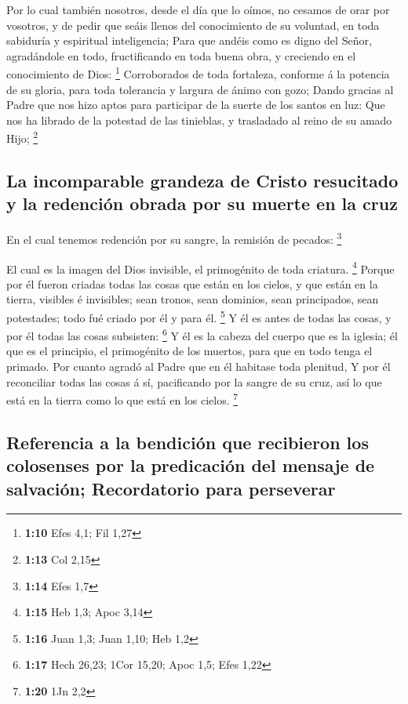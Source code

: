  Por lo cual también nosotros, desde el día que lo oímos, no
cesamos de orar por vosotros, y de pedir que seáis llenos del
conocimiento de su voluntad, en toda sabiduría y espiritual
inteligencia;  Para que andéis como es digno del Señor,
agradándole en todo, fructificando en toda buena obra, y creciendo en el
conocimiento de Dios: \footnote{\textbf{1:10} Efes 4,1; Fil 1,27}
 Corroborados de toda fortaleza, conforme á la potencia de
su gloria, para toda tolerancia y largura de ánimo con gozo;
 Dando gracias al Padre que nos hizo aptos para participar
de la suerte de los santos en luz:  Que nos ha librado de
la potestad de las tinieblas, y trasladado al reino de su amado Hijo;
\footnote{\textbf{1:13} Col 2,15}

\hypertarget{la-incomparable-grandeza-de-cristo-resucitado-y-la-redenciuxf3n-obrada-por-su-muerte-en-la-cruz}{%
\subsection{La incomparable grandeza de Cristo resucitado y la redención
obrada por su muerte en la
cruz}\label{la-incomparable-grandeza-de-cristo-resucitado-y-la-redenciuxf3n-obrada-por-su-muerte-en-la-cruz}}

 En el cual tenemos redención por su sangre, la remisión de
pecados: \footnote{\textbf{1:14} Efes 1,7}

 El cual es la imagen del Dios invisible, el primogénito de
toda criatura. \footnote{\textbf{1:15} Heb 1,3; Apoc 3,14} 
Porque por él fueron criadas todas las cosas que están en los cielos, y
que están en la tierra, visibles é invisibles; sean tronos, sean
dominios, sean principados, sean potestades; todo fué criado por él y
para él. \footnote{\textbf{1:16} Juan 1,3; Juan 1,10; Heb 1,2}
 Y él es antes de todas las cosas, y por él todas las cosas
subsisten: \footnote{\textbf{1:17} Hech 26,23; 1Cor 15,20; Apoc 1,5;
  Efes 1,22}  Y él es la cabeza del cuerpo que es la
iglesia; él que es el principio, el primogénito de los muertos, para que
en todo tenga el primado.  Por cuanto agradó al Padre que
en él habitase toda plenitud,  Y por él reconciliar todas
las cosas á sí, pacificando por la sangre de su cruz, así lo que está en
la tierra como lo que está en los cielos. \footnote{\textbf{1:20} 1Jn
  2,2}

\hypertarget{referencia-a-la-bendiciuxf3n-que-recibieron-los-colosenses-por-la-predicaciuxf3n-del-mensaje-de-salvaciuxf3n-recordatorio-para-perseverar}{%
\subsection{Referencia a la bendición que recibieron los colosenses por
la predicación del mensaje de salvación; Recordatorio para
perseverar}\label{referencia-a-la-bendiciuxf3n-que-recibieron-los-colosenses-por-la-predicaciuxf3n-del-mensaje-de-salvaciuxf3n-recordatorio-para-perseverar}}


